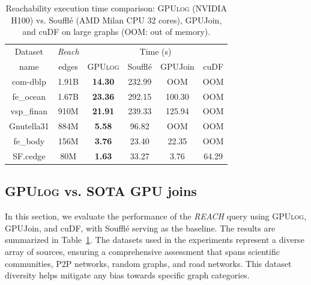 \documentclass[nonacm,sigplan]{acmart}
\newcommand{\tool}{\textsc{GPUlog}}
\begin{document}
\begin{table}[h]
    \fontsize{9}{11}\selectfont
    \caption{\fontsize{9}{11}\selectfont Reachability execution time comparison: \tool{} (NVIDIA H100) vs. Souffl\'e (AMD Milan CPU 32 cores), GPUJoin, and cuDF on large graphs (OOM: out of memory).}  
    \begin{tabular}{c||c||c|c|c|c}
    \toprule
    \multicolumn{1}{c}{Dataset} & \multicolumn{1}{c}{\textit{Reach}} & \multicolumn{4}{c}{Time (s)} \\ 
    \multicolumn{1}{c}{name} & \multicolumn{1}{c}{edges} & \tool{}      & Souffl\'e     & GPUJoin  & cuDF  \\ \midrule
    com-dblp            & 1.91B    & \textbf{14.30}     & 232.99   &  OOM    & OOM \\
    fe\_ocean           & 1.67B    & \textbf{23.36}     & 292.15   &  100.30 & OOM \\
    vsp\_finan          & 910M      & \textbf{21.91}     & 239.33   &  125.94 & OOM \\
    Gnutella31          & 884M      & \textbf{5.58}      & 96.82    &  OOM    & OOM \\ 
    fe\_body            & 156M      & \textbf{3.76}      & 23.40    &  22.35  & OOM \\
    SF.cedge            & 80M       & \textbf{1.63}      & 33.27    &  3.76  & 64.29 \\ 
    \bottomrule
    \end{tabular}
   \label{tab:reach_compare}
\end{table}


\subsection{\tool{} vs. SOTA GPU joins}

\label{eval:vs-other-joins}

In this section, we evaluate the performance of the \textit{REACH} query using \tool{}, GPUJoin, and cuDF, with Souffl\'e serving as the baseline. The results are summarized in Table~\ref{tab:reach_compare}.
The datasets used in the experiments represent a diverse array of sources, ensuring a comprehensive assessment that spans scientific communities, P2P networks, random graphs, and road networks. This dataset diversity helps mitigate any bias towards specific graph categories. 
\end{document}
